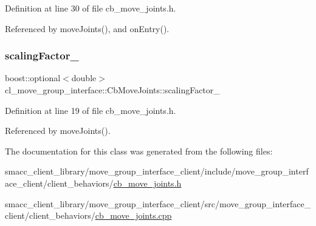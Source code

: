 Definition at line 30 of file cb\+\_\+move\+\_\+joints.\+h.



Referenced by move\+Joints(), and on\+Entry().

\mbox{\label{classcl__move__group__interface_1_1CbMoveJoints_a2480db16c4bf55a40701c00cd2afe9a0}} 
\subsubsection{\texorpdfstring{scaling\+Factor\+\_\+}{scalingFactor\_}}
{\footnotesize\ttfamily boost\+::optional$<$double$>$ cl\+\_\+move\+\_\+group\+\_\+interface\+::\+Cb\+Move\+Joints\+::scaling\+Factor\+\_\+}



Definition at line 19 of file cb\+\_\+move\+\_\+joints.\+h.



Referenced by move\+Joints().



The documentation for this class was generated from the following files\+:\begin{DoxyCompactItemize}
\item 
smacc\+\_\+client\+\_\+library/move\+\_\+group\+\_\+interface\+\_\+client/include/move\+\_\+group\+\_\+interface\+\_\+client/client\+\_\+behaviors/\hyperlink{cb__move__joints_8h}{cb\+\_\+move\+\_\+joints.\+h}\item 
smacc\+\_\+client\+\_\+library/move\+\_\+group\+\_\+interface\+\_\+client/src/move\+\_\+group\+\_\+interface\+\_\+client/client\+\_\+behaviors/\hyperlink{cb__move__joints_8cpp}{cb\+\_\+move\+\_\+joints.\+cpp}\end{DoxyCompactItemize}
